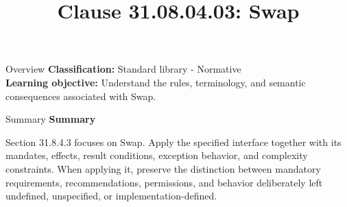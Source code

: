 \documentclass[10pt,letterpaper]{article}
\title{Clause 31.08.04.03: Swap}
\author{}
\date{}
\begin{document}
\maketitle
\begin{CornellOverviewBox}{Overview}
\textbf{Classification:} Standard library - Normative\\[2pt]
\textbf{Learning objective:} Understand the rules, terminology, and semantic consequences associated with Swap.
\end{CornellOverviewBox}\begin{CornellSummaryBox}{Summary}
{\sffamily\bfseries\color{Accent} Summary}\par\vspace{3pt}Section 31.8.4.3 focuses on Swap. Apply the specified interface together with its mandates, effects, result conditions, exception behavior, and complexity constraints. When applying it, preserve the distinction between mandatory requirements, recommendations, permissions, and behavior deliberately left undefined, unspecified, or implementation-defined.
\end{CornellSummaryBox}
\end{document}
